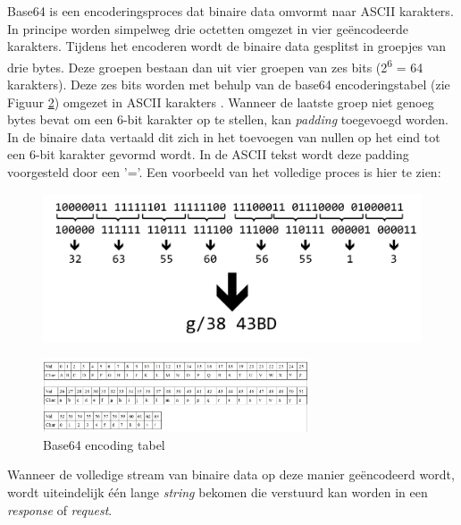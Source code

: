 Base64 is een encoderingsproces dat binaire data omvormt naar ASCII karakters. %
In principe worden simpelweg drie octetten omgezet in vier ge\"{e}ncodeerde karakters. Tijdens het encoderen wordt de binaire data gesplitst in groepjes van drie bytes. Deze groepen bestaan dan uit vier groepen van zes bits (2\textsuperscript{6} = 64 karakters). Deze zes bits worden met behulp van de base64 encoderingstabel (zie Figuur \ref{fig:Base64Table}) omgezet in ASCII karakters \cite{Base64}. Wanneer de laatste groep niet genoeg bytes bevat om een 6-bit karakter op te stellen, kan \textit{padding} toegevoegd worden. In de binaire data vertaald dit zich in het toevoegen van nullen op het eind tot een 6-bit karakter gevormd wordt. In de ASCII tekst wordt deze padding voorgesteld door een '='. Een voorbeeld van het volledige proces is hier te zien: 

\begin{figure}[H]
	\centering
	\includegraphics[width=1\textwidth]{Figuren/Base64Process.png}
	\label{fig:Base64}
\end{figure}

\begin{figure}[H]
	\centering
	\includegraphics[width=0.7\textwidth]{Figuren/Base64EncodingTable.jpg}
	\caption{Base64 encoding tabel \cite{Base64Image}}
	\label{fig:Base64Table}
\end{figure} 

Wanneer de volledige stream van binaire data op deze manier ge\"{e}ncodeerd wordt, wordt uiteindelijk \'{e}\'{e}n lange \textit{string} bekomen die verstuurd kan worden in een \textit{response} of \textit{request}.

